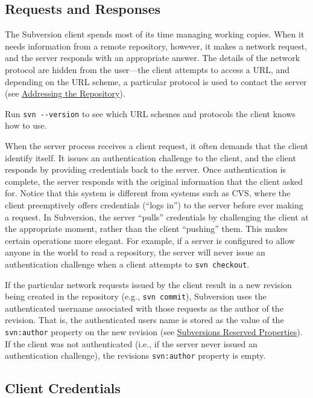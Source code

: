 \subsection{Requests and
Responses}\label{svn.serverconfig.netmodel.reqresp}

The Subversion client spends most of its time managing working copies.
When it needs information from a remote repository, however, it makes a
network request, and the server responds with an appropriate answer. The
details of the network protocol are hidden from the user---the client
attempts to access a URL, and depending on the URL scheme, a particular
protocol is used to contact the server (see
\hyperref[svn.advanced.reposurls]{Addressing the Repository}).

Run \texttt{svn\ -\/-version} to see which URL schemes and protocols the
client knows how to use.

When the server process receives a client request, it often demands that
the client identify itself. It issues an authentication challenge to the
client, and the client responds by providing credentials back to the
server. Once authentication is complete, the server responds with the
original information that the client asked for. Notice that this system
is different from systems such as CVS, where the client preemptively
offers credentials (``logs in'') to the server before ever making a
request. In Subversion, the server ``pulls'' credentials by challenging
the client at the appropriate moment, rather than the client ``pushing''
them. This makes certain operations more elegant. For example, if a
server is configured to allow anyone in the world to read a repository,
the server will never issue an authentication challenge when a client
attempts to \texttt{svn\ checkout}.

If the particular network requests issued by the client result in a new
revision being created in the repository (e.g., \texttt{svn\ commit}),
Subversion uses the authenticated username associated with those
requests as the author of the revision. That is, the authenticated
user\textquotesingle s name is stored as the value of the
\texttt{svn:author} property on the new revision (see
\hyperref[svn.advanced.props.ref]{Subversion\textquotesingle s Reserved
Properties}). If the client was not authenticated (i.e., if the server
never issued an authentication challenge), the
revision\textquotesingle s \texttt{svn:author} property is empty.

\subsection{Client Credentials}\label{svn.serverconfig.netmodel.creds}

